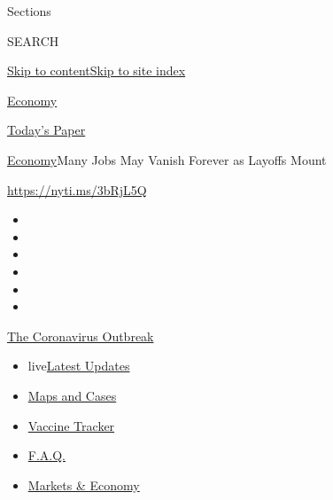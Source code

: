Sections

SEARCH

\protect\hyperlink{site-content}{Skip to
content}\protect\hyperlink{site-index}{Skip to site index}

\href{https://www.nytimes.com/section/business/economy}{Economy}

\href{https://myaccount.nytimes.com/auth/login?response_type=cookie\&client_id=vi}{}

\href{https://www.nytimes.com/section/todayspaper}{Today's Paper}

\href{/section/business/economy}{Economy}\textbar{}Many Jobs May Vanish
Forever as Layoffs Mount

\href{https://nyti.ms/3bRjL5Q}{https://nyti.ms/3bRjL5Q}

\begin{itemize}
\item
\item
\item
\item
\item
\item
\end{itemize}

\href{https://www.nytimes.com/news-event/coronavirus?action=click\&pgtype=Article\&state=default\&region=TOP_BANNER\&context=storylines_menu}{The
Coronavirus Outbreak}

\begin{itemize}
\tightlist
\item
  live\href{https://www.nytimes.com/2020/08/08/world/coronavirus-updates.html?action=click\&pgtype=Article\&state=default\&region=TOP_BANNER\&context=storylines_menu}{Latest
  Updates}
\item
  \href{https://www.nytimes.com/interactive/2020/us/coronavirus-us-cases.html?action=click\&pgtype=Article\&state=default\&region=TOP_BANNER\&context=storylines_menu}{Maps
  and Cases}
\item
  \href{https://www.nytimes.com/interactive/2020/science/coronavirus-vaccine-tracker.html?action=click\&pgtype=Article\&state=default\&region=TOP_BANNER\&context=storylines_menu}{Vaccine
  Tracker}
\item
  \href{https://www.nytimes.com/interactive/2020/world/coronavirus-tips-advice.html?action=click\&pgtype=Article\&state=default\&region=TOP_BANNER\&context=storylines_menu}{F.A.Q.}
\item
  \href{https://www.nytimes.com/live/2020/08/07/business/stock-market-today-coronavirus?action=click\&pgtype=Article\&state=default\&region=TOP_BANNER\&context=storylines_menu}{Markets
  \& Economy}
\end{itemize}

